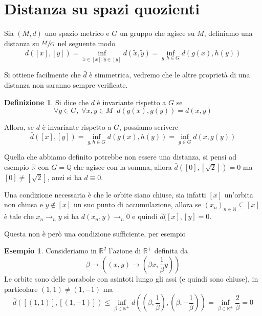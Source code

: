 \documentclass[a4paper,10pt]{article}
\newcounter{counter1}
\theoremstyle{plain}
\theoremstyle{definition}
\newtheorem{mydef}[counter1]{Definizione}
\newtheorem{myes}[counter1]{Esempio}
\theoremstyle{remark}
\newtheorem{mynot}[counter1]{Nota}
\newcommand{\pa}[1]{\left(#1\right)}
\newcommand{\bra}[1]{\left[#1\right]}
\begin{document}




\section{Distanza su spazi quozienti}

Sia $(M,d)$ uno spazio metrico e $G$ un gruppo che agisce su $M$,
definiamo una distanza su $\sfrac{M}{G}$ nel seguente modo
\[ \bar d (\bra{x}, \bra{y}) = \inf _{\tilde x \in \bra{x} , \tilde y
  \in \bra {y}} d(\tilde x , \tilde y) = \inf _ {g,h \in G} d(g(x),
h(y)) \]

Si ottiene facilmente che $\bar d$ è simmetrica, vedremo che le altre
proprietà di una distanza non saranno sempre verificate.

\begin{mydef}
  Si dice che $d$ è invariante rispetto a $G$ se
\[ \forall g \in G,\; \forall x,y \in M \;\; d(g(x),g(y)) = d(x,y) \]
\end{mydef}

Allora, se $d$ è invariante rispetto a $G$, possiamo scrivere
\[ \bar d (\bra{x}, \bra{y}) = \inf _ {g,h \in G} d(g(x), h(y)) =
\inf _{g \in G} d(x,g(y)) \]

Quella che abbiamo definito potrebbe non essere una distanza, si pensi
ad esempio $\mathbb{R}$ con $G = \mathbb{Q}$ che agisce con la somma,
allora $\bar d \pa{ \bra{0} , \bra{\sqrt{2}} } = 0$ ma $\bra{0} \neq
\bra{\sqrt{2}}$, anzi si ha $d \equiv 0$.

Una condizione necessaria è che le orbite siano chiuse, sia infatti
$\bra{x}$ un'orbita non chiusa e $y \not\in \bra{x}$ un suo punto di
accumulazione, allora se $\pa{ x_n} _{n \in \mathbb{N}} \subseteq
\bra{x}$ è tale che $x_n \to _n y$ si ha $d(x_n,y) \to _n 0$ e quindi
$\bar d(\bra{x},\bra{y} = 0$.

Questa non è però una condizione sufficiente, per esempio
\begin{myes}
  Consideriamo in $\mathbb{R}^2$ l'azione di $\mathbb{R}^+$ definita
  da
  \[ \beta \to \pa{ \pa{x,y} \to \pa{\beta x , \frac{1}{\beta}y } } \]
  Le orbite sono delle parabole con asintoti lungo gli assi (e quindi
  sono chiuse), in particolare $\pa{1,1} \neq \pa{1,-1}$ ma
  \[ \bar d( \bra{ \pa{ 1,1} } , \bra{ \pa {1, -1}} ) \le \inf _{\beta
    \in \mathbb{R}^+ } d\pa{ \pa{ \beta , \frac{1}{\beta} } , \pa{
      \beta , - \frac{1}{\beta}} } = \inf _{ \beta \in \mathbb{R}^+ }
  \frac{2}{\beta} = 0 \]
\end{myes}
\end{document}
